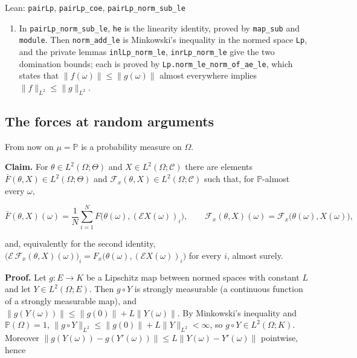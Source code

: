 \documentclass[11pt,a4paper]{report}
\begin{document}
\begin{leanbox}{Lean: \texttt{pairLp}, \texttt{pairLp\_\allowbreak{}coe}, \texttt{pairLp\_\allowbreak{}norm\_\allowbreak{}sub\_\allowbreak{}le}}
\begin{enumerate}
\item In \texttt{pair\allowbreak{}Lp\_\allowbreak{}norm\_\allowbreak{}sub\_\allowbreak{}le}, \texttt{he} is the linearity identity, proved by \texttt{map\_\allowbreak{}sub} and \texttt{module}. Then \texttt{norm\_\allowbreak{}add\_\allowbreak{}le} is Minkowski's inequality in the normed space \texttt{Lp}, and the private lemmas \texttt{inl\allowbreak{}Lp\_\allowbreak{}norm\_\allowbreak{}le}, \texttt{inr\allowbreak{}Lp\_\allowbreak{}norm\_\allowbreak{}le} give the two domination bounds; each is proved by \texttt{Lp.\allowbreak{}norm\_\allowbreak{}le\_\allowbreak{}norm\_\allowbreak{}of\_\allowbreak{}ae\_\allowbreak{}le}, which states that \(\|f(\omega)\|\le\|g(\omega)\|\) almost everywhere implies \(\|f\|_{L^2}\le\|g\|_{L^2}\).

\end{enumerate}
\end{leanbox}
\subsection{\texorpdfstring{The forces at random arguments}{The forces at random arguments}}


From now on \(\mu=\mathbb P\) is a probability measure on \(\Omega\).




\textbf{Claim.} For \(\theta\in L^2(\Omega;\Theta)\) and \(X\in L^2(\Omega;\mathcal C)\) there are elements \(\bar F(\theta,X)\in L^2(\Omega;\Theta)\) and \(\mathcal F_x(\theta,X)\in L^2(\Omega;\mathcal C)\) such that, for \(\mathbb P\)-almost every \(\omega\),


\[\bar F(\theta,X)(\omega)=\frac1N\sum_{i=1}^NF\bigl(\theta(\omega),(\mathcal EX(\omega))_i\bigr),\qquad \mathcal F_x(\theta,X)(\omega)=\mathcal F_x\bigl(\theta(\omega),X(\omega)\bigr),\]


and, equivalently for the second identity, \(\bigl(\mathcal E\,\mathcal F_x(\theta,X)(\omega)\bigr)_i=F_x\bigl(\theta(\omega),(\mathcal EX(\omega))_i\bigr)\) for every \(i\), almost surely.




\textbf{Proof.} Let \(g:E\to K\) be a Lipschitz map between normed spaces with constant \(L\) and let \(Y\in L^2(\Omega;E)\). Then \(g\circ Y\) is strongly measurable (a continuous function of a strongly measurable map), and \(\|g(Y(\omega))\|\le\|g(0)\|+L\|Y(\omega)\|\). By Minkowski's inequality and \(\mathbb P(\Omega)=1\), \(\|g\circ Y\|_{L^2}\le\|g(0)\|+L\|Y\|_{L^2}<\infty\), so \(g\circ Y\in L^2(\Omega;K)\). Moreover \(\|g(Y(\omega))-g(Y'(\omega))\|\le L\|Y(\omega)-Y'(\omega)\|\) pointwise, hence
\end{document}
